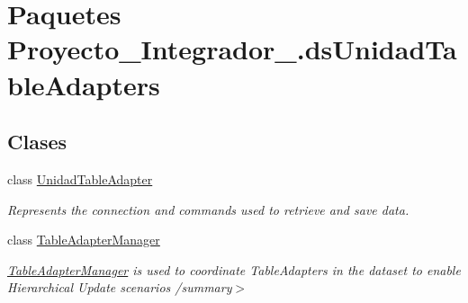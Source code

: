 \hypertarget{namespace_proyecto___integrador__3_1_1ds_unidad_table_adapters}{\section{Paquetes Proyecto\-\_\-\-Integrador\-\_.\-ds\-Unidad\-Table\-Adapters}
\label{namespace_proyecto___integrador__3_1_1ds_unidad_table_adapters}
}
\subsection*{Clases}
\begin{DoxyCompactItemize}
\item 
class \hyperlink{class_proyecto___integrador__3_1_1ds_unidad_table_adapters_1_1_unidad_table_adapter}{Unidad\-Table\-Adapter}
\begin{DoxyCompactList}\small\item\em Represents the connection and commands used to retrieve and save data. \end{DoxyCompactList}\item 
class \hyperlink{class_proyecto___integrador__3_1_1ds_unidad_table_adapters_1_1_table_adapter_manager}{Table\-Adapter\-Manager}
\begin{DoxyCompactList}\small\item\em \hyperlink{class_proyecto___integrador__3_1_1ds_unidad_table_adapters_1_1_table_adapter_manager}{Table\-Adapter\-Manager} is used to coordinate Table\-Adapters in the dataset to enable Hierarchical Update scenarios /summary$>$ \end{DoxyCompactList}\end{DoxyCompactItemize}
